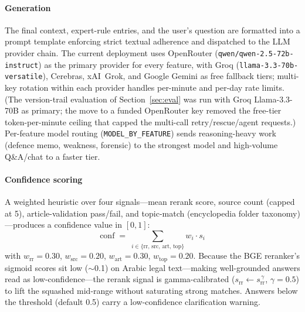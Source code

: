 \documentclass[final,1p,times]{elsarticle}
\begin{document}
\paragraph{Generation} The final context, expert-rule entries, and the user's
question are formatted into a prompt template enforcing strict textual adherence
and dispatched to the LLM provider chain. The current deployment uses OpenRouter
(\texttt{qwen/qwen-2.5-72b-instruct}) as the primary provider for every feature,
with Groq (\texttt{llama-3.3-70b-versatile}), Cerebras, xAI~Grok, and Google
Gemini as free fallback tiers; multi-key rotation within each provider handles
per-minute and per-day rate limits. (The version-trail evaluation of
Section~\ref{sec:eval} was run with Groq Llama-3.3-70B as primary; the move to a
funded OpenRouter key removed the free-tier token-per-minute ceiling that capped
the multi-call retry/rescue/agent requests.) Per-feature model routing
(\texttt{MODEL\_BY\_FEATURE}) sends reasoning-heavy work (defence memo, weakness,
forensic) to the strongest model and high-volume Q\&A/chat to a faster tier.

\paragraph{Confidence scoring} A weighted heuristic over four signals---mean
rerank score, source count (capped at 5), article-validation pass/fail, and
topic-match (encyclopedia folder taxonomy)---produces a confidence value
in $[0,1]$:
\begin{equation}
\mathrm{conf} \;=\; \sum_{i \in \{\mathrm{rr},\,\mathrm{src},\,\mathrm{art},\,\mathrm{top}\}} w_i \cdot s_i
\label{eq:conf}
\end{equation}
with $w_{\mathrm{rr}}=0.30$, $w_{\mathrm{src}}=0.20$,
$w_{\mathrm{art}}=0.30$, $w_{\mathrm{top}}=0.20$. Because the BGE reranker's
sigmoid scores sit low ($\sim$0.1) on Arabic legal text---making well-grounded
answers read as low-confidence---the rerank signal is gamma-calibrated
($s_{\mathrm{rr}} \leftarrow s_{\mathrm{rr}}^{\,\gamma}$, $\gamma=0.5$) to lift
the squashed mid-range without saturating strong matches. Answers below the
threshold (default 0.5) carry a low-confidence clarification warning.
\end{document}

